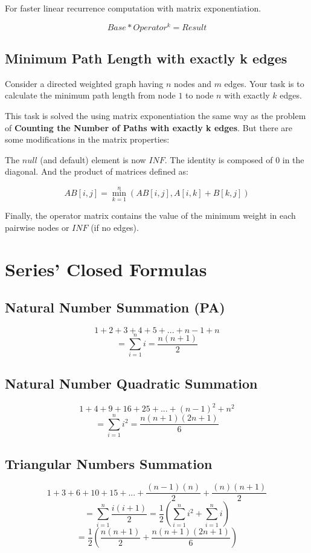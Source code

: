 For faster linear recurrence computation with matrix exponentiation. 

$$ Base * Operator^{k} = Result $$


\subsection{Minimum Path Length with exactly k edges}

Consider a directed weighted graph having $n$ nodes and $m$ edges.
Your task is to calculate the minimum path length from node $1$ to node $n$ with exactly $k$ edges.

This task is solved the using matrix exponentiation the 
same way as the problem of \textbf{Counting the Number of Paths with exactly k edges}.
But there are some modifications in the matrix properties: 

The $null$ (and default) element is now $INF$. The identity is composed of $0$ in the diagonal.
And the product of matrices defined as:

$$ AB[i, j] = \min^{n}_{k=1} (AB[i, j], A[i,k] + B[k, j]) $$

Finally, the operator matrix contains the value of the minimum weight in each pairwise nodes or $INF$ (if no edges). 

\section{Series' Closed Formulas}

\subsection{Natural Number Summation (PA)}

$$ 1 + 2 + 3 + 4 + 5 + ... + n-1 + n $$
$$ = \sum_{i=1}^n i = \frac{ n(n+1) }{ 2 } $$

\subsection{Natural Number Quadratic Summation}

$$ 1 + 4 + 9 + 16 + 25 + ... + (n-1)^2 + n^2 $$
$$ = \sum_{i=1}^n i^2 = \frac{ n(n+1)(2n+1) }{ 6 } $$

\subsection{Triangular Numbers Summation}

$$ 1 + 3 + 6 + 10 + 15 + ... + \frac{(n-1)(n)}{2} + \frac{(n)(n+1)}{2} $$
$$ = \sum_{i=1}^n \frac{i(i+1)}{2} = \frac{1}{2}(\sum_{i=1}^n i^2 + \sum_{i=1}^n i) $$
$$ = \frac{1}{2} ( \frac{ n(n+1) }{ 2 } + \frac{ n(n+1)(2n+1) }{ 6 }) $$